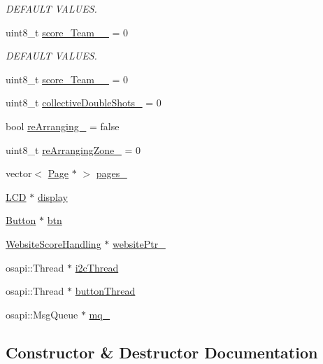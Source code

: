 \begin{DoxyCompactItemize}
\begin{DoxyCompactList}\small\item\em D\+E\+F\+A\+U\+LT V\+A\+L\+U\+ES. \end{DoxyCompactList}\item 
uint8\+\_\+t \hyperlink{class_score_system_crtl_a7a81b6a251a2b6ace8d43bcac1f2ac9a}{score\+\_\+\+Team\+\_\+\_\+} = 0
\begin{DoxyCompactList}\small\item\em D\+E\+F\+A\+U\+LT V\+A\+L\+U\+ES. \end{DoxyCompactList}\item 
uint8\+\_\+t \hyperlink{class_score_system_crtl_a2e3179ced68d428cb1d5bdf551772198}{score\+\_\+\+Team\+\_\+\_\+} = 0
\item 
uint8\+\_\+t \hyperlink{class_score_system_crtl_ab02d528662eb8284cce8e8cbb62b4a45}{collective\+Double\+Shots\+\_\+} = 0
\item 
bool \hyperlink{class_score_system_crtl_ad14ec0e42018683bea64c7b575889c10}{re\+Arranging\+\_\+} = false
\item 
uint8\+\_\+t \hyperlink{class_score_system_crtl_a7a192f635f055a2e33d7faa1f97d3e66}{re\+Arranging\+Zone\+\_\+} = 0
\item 
vector$<$ \hyperlink{class_page}{Page} $\ast$ $>$ \hyperlink{class_score_system_crtl_afebc95fe508117fb6f0642b07515da8d}{pages\+\_\+}
\item 
\hyperlink{class_l_c_d}{L\+CD} $\ast$ \hyperlink{class_score_system_crtl_a3111d9f033967ce5d52a3bf2714b5b29}{display}
\item 
\hyperlink{class_button}{Button} $\ast$ \hyperlink{class_score_system_crtl_aa4b1c98fb3cddcc8d41c575cabb6115f}{btn}
\item 
\hyperlink{class_website_score_handling}{Website\+Score\+Handling} $\ast$ \hyperlink{class_score_system_crtl_a8a252e6501be65ecb4c233c12ca2e0a1}{website\+Ptr\+\_\+}
\item 
osapi\+::\+Thread $\ast$ \hyperlink{class_score_system_crtl_a03511b42262a18c002496a1448de12c2}{i2c\+Thread}
\item 
osapi\+::\+Thread $\ast$ \hyperlink{class_score_system_crtl_a48e0963e0c602f187099acd521a845dd}{button\+Thread}
\item 
osapi\+::\+Msg\+Queue $\ast$ \hyperlink{class_score_system_crtl_abb07ef8f5a3a2edfd16b08f21dfe4656}{mq\+\_\+}
\end{DoxyCompactItemize}


\subsection{Constructor \& Destructor Documentation}
\mbox{\label{class_score_system_crtl_aa5e275c79e3e60dec6eb12da70ebe382}} 
